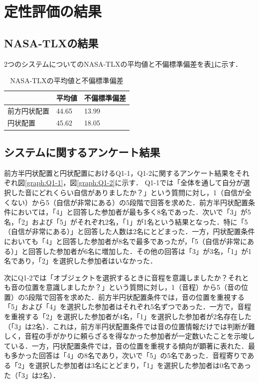 \section{定性評価の結果}
\subsection{NASA-TLXの結果}
2つのシステムについてのNASA-TLXの平均値と不偏標準偏差を表\ref{tab:NASA}に示す．

\begin{table}[H]\centering 
    \caption{NASA-TLXの平均値と不偏標準偏差}\label{tab:NASA}
    \begin{tabular}{lll} \hline
     & 平均値 & 不偏標準偏差\\ \hline
    前方円状配置 & 44.65 & 13.99\\
    円状配置 & 45.62 & 18.05 \\ \hline
    \end{tabular}
\end{table}



\subsection{システムに関するアンケート結果}

前方半円状配置と円状配置におけるQ1-1，Q1-2に関するアンケート結果をそれぞれ図\ref{graph:Q1-1}，図\ref{graph:Q1-2}に示す． Q1-1では「全体を通して自分が選択した音にどれくらい自信がありましたか？」という質問に対し，1（自信が全くない）から5（自信が非常にある）の5段階で回答を求めた．前方半円状配置条件においては，「4」と回答した参加者が最も多く8名であった．次いで「3」が5名，「2」および「5」がそれぞれ2名，「1」が1名という結果となった．特に「5（自信が非常にある）」と回答した人数は2名にとどまった．一方，円状配置条件においても「4」と回答した参加者が8名で最多であったが，「5（自信が非常にある）」と回答した参加者が6名に増加した．その他の回答は「3」が3名，「1」が1名であり，「2」を選択した参加者はいなかった．

次にQ1-2では「オブジェクトを選択するときに音程を意識しましたか？それとも音の位置を意識しましたか？」という質問に対し，1（音程）から5（音の位置）の5段階で回答を求めた．前方半円状配置条件では，音の位置を重視する「5」および「4」を選択した参加者はそれぞれ5名ずつであった．一方で，音程を重視する「2」を選択した参加者が4名，「1」を選択した参加者が2名存在した（「3」は2名）．これは，前方半円状配置条件では音の位置情報だけでは判断が難しく，音程の手がかりに頼らざるを得なかった参加者が一定数いたことを示唆している．一方，円状配置条件では，音の位置を重視する傾向が顕著に表れた．最も多かった回答は「4」の8名であり，次いで「5」の5名であった．音程寄りである「2」を選択した参加者は3名にとどまり，「1」を選択した参加者は0名であった（「3」は2名）．

